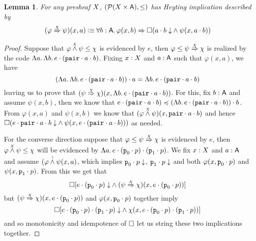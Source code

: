 \documentclass[11pt]{article}
\newtheorem{lemm}[thrm]{Lemma}
\begin{document}
\begin{lemm}\label{lemm:tripos-heyting-implication}
  For any presheaf \(X\), \((\mathcal{P}{({X}\times{\ensuremath{\mathsf{A}}})}, \leq)\) has Heyting
  implication described by
  \begin{gather}
    (\TImplies{\varphi}{\psi}{\X})(x,a)
    \IsDefined
    \IForall{b : \A}{%
      \IImplies%
      {\varphi(x,b)}%
      {\IBox{(%
          \IAnd%
          {\ITotal{\IAp{a}{b}}}%
          {\psi(x,\IAp{a}{b})}
    )}}}
    \label{defn:tripos-heyting-implication}
  \end{gather}
\end{lemm}
\begin{proof}
  Suppose that \({\varphi}\overset{\scriptscriptstyle X}{\land}{\psi} \leq \chi\) is evidenced by \(e\),
  then \(\varphi \leq {\psi}\overset{\scriptscriptstyle X}{\Rightarrow}{\chi}\) is realized by the code
  \(\Lambda{a}.\,{\Lambda{b}.\,{{e}\cdot{({{\texttt{pair}}\cdot{a}}\cdot{b})}}}\).
  Fixing \(x : X\) and \(a : \mathsf{A}\) such that \(\varphi(x,a)\), we have
  \[\IEq%
  {\IAp{(\IAbs{a}{\IAbs{b}{\IPAp{e}{(\IPAp{\IPAp{\IPairCode}{a}}{b})}}})}{a}}%
  {\IAbs{b}{\IPAp{e}{(\IPAp{\IPAp{\IPairCode}{a}}{b})}}}%
  \]
  leaving us to prove that
  \(
  (\TImplies{\psi}{\chi}{\X})%
  (x, \IAbs{b}{\IPAp{e}{(\IPAp{\IPAp{\IPairCode}{a}}{b})}})%
  \).
  For this, fix \(b : \mathsf{A}\) and assume \(\psi(x,b)\), then we know that
  \(\IPLeq%
  {\IPAp{e}{(\IPAp{\IPAp{\IPairCode}{a}}{b})}}%
  {\IAp{(\IAbs{b}{\IPAp{e}{(\IPAp{\IPAp{\IPairCode}{a}}{b})}})}{b}}\).
  From \(\varphi(x,a)\) and \(\psi(x,b)\) we know that
  \(({\varphi}\overset{\scriptscriptstyle X}{\land}{\psi})(x,{{\texttt{pair}}\cdot{a}}\cdot{b})\) and hence
  \(\IBox{(%
    \IAnd%
    {\ITotal{\IAp{e}{\IPAp{\IPAp{\IPairCode}{a}}{b}}}}%
    {\psi(x,\IAp{e}{(\IPAp{\IPAp{\IPairCode}{a}}{b})})})}%
  \)
  as needed.

  For the converse direction suppose that
  \(\varphi \leq {\psi}\overset{\scriptscriptstyle X}{\Rightarrow}{\chi}\) is evidenced by \(e\), then
  \({\varphi}\overset{\scriptscriptstyle X}{\land}{\psi} \leq \chi\) will be evidenced by
  \(\Lambda{a}.\,{{{e}\cdot{({\texttt{p}_0}\cdot{p})}}\cdot{({\texttt{p}_1}\cdot{p})}}\).
  We fix \(x : X\) and \(a : \mathsf{A}\) and assume \(({\varphi}\overset{\scriptscriptstyle )}{\land}{\psi}(x,a)\),
  which implies \({{\texttt{p}_0}\cdot{p}}\downarrow\),
  \({{\texttt{p}_1}\cdot{p}}\downarrow\) and both \(\varphi(x,{\texttt{p}_0}\cdot{p})\)
  and \(\psi(x,{\texttt{p}_1}\cdot{p})\).
  From this we get that
  \[
    \IBox{[\IAnd%
    {\ITotal{\IPAp{e}{(\IPAp{\IFstCode}{p})}}}%
    {(\TImplies{\psi}{\chi}{\X})(x,\IPAp{e}{(\IPAp{\IFstCode}{p})})}%
    ]}
  \]
  but \(({\psi}\overset{\scriptscriptstyle X}{\Rightarrow}{\chi})(x,{e}\cdot{({\texttt{p}_0}\cdot{p})})\) and
  \(\varphi(x,{\texttt{p}_0}\cdot{p})\) together imply
  \[
    \IBox{[\IAnd%
    {\ITotal{\IPAp{\IPAp{e}{(\IPAp{\IFstCode}{p})}}{(\IPAp{\ISndCode}{p})}}}%
    {\chi(x,\IPAp{\IPAp{e}{(\IPAp{\IFstCode}{p})}}{(\IPAp{\ISndCode}{p})})}%
    ]}
  \]
  and so monotonicity and idempotence of \(\Box\) let us string
  these two implications together.
\end{proof}
\end{document}
